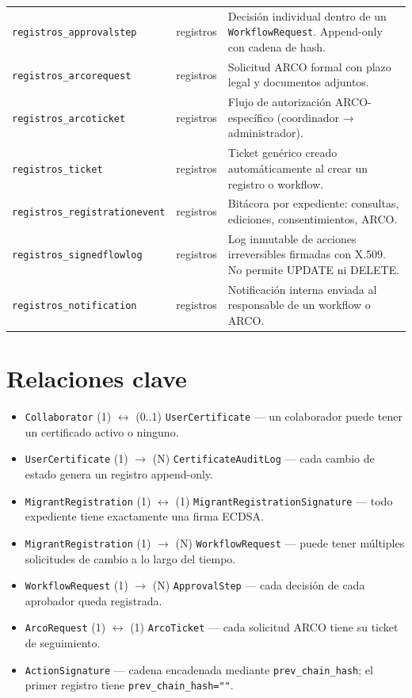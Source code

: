 \documentclass[10pt,letterpaper]{report}
\begin{document}
\begin{table}[H]
\begin{tabularx}{\textwidth}{l l X}
\texttt{registros\_approvalstep} & registros & Decisión individual dentro de un \texttt{WorkflowRequest}. Append-only con cadena de hash. \\
\texttt{registros\_arcorequest} & registros & Solicitud ARCO formal con plazo legal y documentos adjuntos. \\
\texttt{registros\_arcoticket} & registros & Flujo de autorización ARCO-específico (coordinador → administrador). \\
\texttt{registros\_ticket} & registros & Ticket genérico creado automáticamente al crear un registro o workflow. \\
\texttt{registros\_registrationevent} & registros & Bitácora por expediente: consultas, ediciones, consentimientos, ARCO. \\
\texttt{registros\_signedflowlog} & registros & Log inmutable de acciones irreversibles firmadas con X.509. No permite UPDATE ni DELETE. \\
\texttt{registros\_notification} & registros & Notificación interna enviada al responsable de un workflow o ARCO. \\
\bottomrule
\end{tabularx}
\end{table}

\section{Relaciones clave}

\begin{itemize}[leftmargin=*]
    \item \texttt{Collaborator} (1) $\leftrightarrow$ (0..1) \texttt{UserCertificate} — un colaborador puede tener un certificado activo o ninguno.
    \item \texttt{UserCertificate} (1) $\to$ (N) \texttt{CertificateAuditLog} — cada cambio de estado genera un registro append-only.
    \item \texttt{MigrantRegistration} (1) $\leftrightarrow$ (1) \texttt{MigrantRegistrationSignature} — todo expediente tiene exactamente una firma ECDSA.
    \item \texttt{MigrantRegistration} (1) $\to$ (N) \texttt{WorkflowRequest} — puede tener múltiples solicitudes de cambio a lo largo del tiempo.
    \item \texttt{WorkflowRequest} (1) $\to$ (N) \texttt{ApprovalStep} — cada decisión de cada aprobador queda registrada.
    \item \texttt{ArcoRequest} (1) $\leftrightarrow$ (1) \texttt{ArcoTicket} — cada solicitud ARCO tiene su ticket de seguimiento.
    \item \texttt{ActionSignature} — cadena encadenada mediante \texttt{prev\_chain\_hash}; el primer registro tiene \texttt{prev\_chain\_hash=""}.
\end{itemize}
\end{document}
